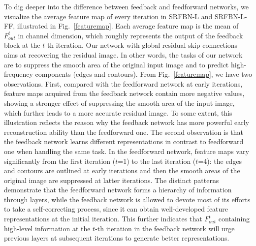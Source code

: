 \documentclass[10pt,twocolumn,letterpaper]{article}
\begin{document}
	To dig deeper into the difference between feedback and feedforward networks, we visualize the average feature map of every iteration in SRFBN-L and SRFBN-L-FF, illustrated in Fig.~\ref{featuremap}. Each average feature map is the mean of $F_{out}^{t}$ in channel dimension, which roughly represents the output of the feedback block at the $t$-th iteration. Our network with global residual skip connections aims at recovering the residual image. In other words, the tasks of our network are to suppress the smooth area of the original input image\cite{Hui-IDN-2018} and to predict high-frequency components (\ie edges and contours). From Fig.~\ref{featuremap}, we have two observations. First, compared with the feedforward network at early iterations, feature maps acquired from the feedback network contain more negative values, showing a stronger effect of suppressing the smooth area of the input image, which further leads to a more accurate residual image. To some extent, this illustration reflects the reason why the feedback network has more powerful early reconstruction ability than the feedforward one. The second observation is that the feedback network learns different representations in contrast to feedforward one when handling the same task. In the feedforward network, feature maps vary significantly from the first iteration ($t$=1) to the last iteration ($t$=4): the edges and contours are outlined at early iterations and then the smooth areas of the original image are suppressed at latter iterations. The distinct patterns demonstrate that the feedforward network forms a hierarchy of information through layers, while the feedback network is allowed to devote most of its efforts to take a self-correcting process, since it can obtain well-developed feature representations at the initial iteration. This further indicates that $F_{out}^{t}$ containing high-level information at the $t$-th iteration in the feedback network will urge previous layers at subsequent iterations to generate better representations.
\end{document}

